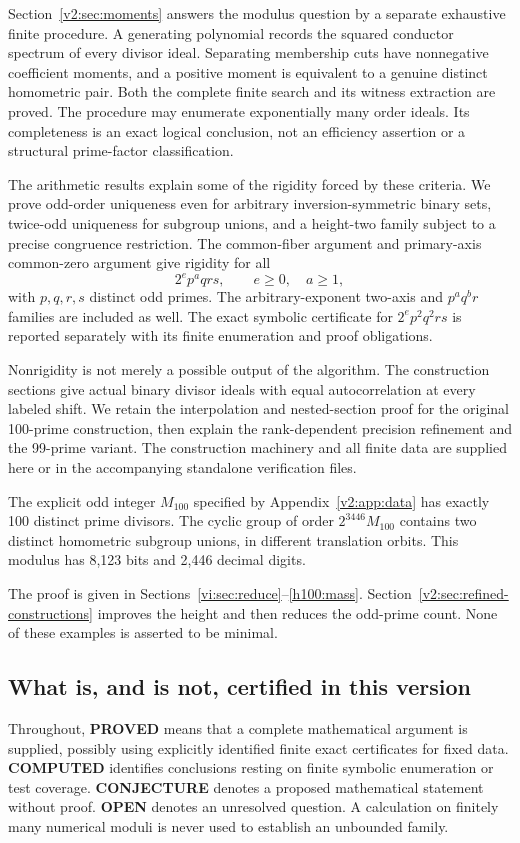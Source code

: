 Section~\ref{v2:sec:moments} answers the modulus question by a separate exhaustive finite procedure. A generating polynomial records the squared conductor spectrum of every divisor ideal. Separating membership cuts have nonnegative coefficient moments, and a positive moment is equivalent to a genuine distinct homometric pair. Both the complete finite search and its witness extraction are proved. The procedure may enumerate exponentially many order ideals. Its completeness is an exact logical conclusion, not an efficiency assertion or a structural prime-factor classification.

The arithmetic results explain some of the rigidity forced by these criteria. We prove odd-order uniqueness even for arbitrary inversion-symmetric binary sets, twice-odd uniqueness for subgroup unions, and a height-two family subject to a precise congruence restriction. The common-fiber argument and primary-axis common-zero argument give rigidity for all
\[
 2^e p^a qrs,\qquad e\ge0,\quad a\ge1,
\]
with $p,q,r,s$ distinct odd primes. The arbitrary-exponent two-axis and $p^a q^b r$ families are included as well. The exact symbolic certificate for $2^e p^2q^2rs$ is reported separately with its finite enumeration and proof obligations.

Nonrigidity is not merely a possible output of the algorithm. The construction sections give actual binary divisor ideals with equal autocorrelation at every labeled shift. We retain the interpolation and nested-section proof for the original 100-prime construction, then explain the rank-dependent precision refinement and the 99-prime variant. The construction machinery and all finite data are supplied here or in the accompanying standalone verification files.

\begin{theorem}\label{vi:th:main}
The explicit odd integer $M_{100}$ specified by Appendix~\ref{v2:app:data} has exactly 100 distinct prime divisors. The cyclic group of order $2^{3446}M_{100}$ contains two distinct homometric subgroup unions, in different translation orbits. This modulus has 8,123 bits and 2,446 decimal digits.
\end{theorem}
The proof is given in Sections~\ref{vi:sec:reduce}--\ref{h100:mass}. Section~\ref{v2:sec:refined-constructions} improves the height and then reduces the odd-prime count. None of these examples is asserted to be minimal.

\subsection{What is, and is not, certified in this version}
Throughout, \textbf{PROVED} means that a complete mathematical argument is supplied, possibly using explicitly identified finite exact certificates for fixed data. \textbf{COMPUTED} identifies conclusions resting on finite symbolic enumeration or test coverage. \textbf{CONJECTURE} denotes a proposed mathematical statement without proof. \textbf{OPEN} denotes an unresolved question. A calculation on finitely many numerical moduli is never used to establish an unbounded family.

